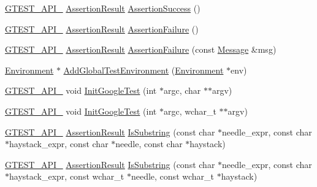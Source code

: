 \begin{DoxyCompactItemize}
\item 
\hyperlink{gtest-port_8h_aa73be6f0ba4a7456180a94904ce17790}{G\+T\+E\+S\+T\+\_\+\+A\+P\+I\+\_\+} \hyperlink{classtesting_1_1AssertionResult}{Assertion\+Result} \hyperlink{namespacetesting_ac1d0baedb17286c5c6c87bd1a45da8ac}{Assertion\+Success} ()
\item 
\hyperlink{gtest-port_8h_aa73be6f0ba4a7456180a94904ce17790}{G\+T\+E\+S\+T\+\_\+\+A\+P\+I\+\_\+} \hyperlink{classtesting_1_1AssertionResult}{Assertion\+Result} \hyperlink{namespacetesting_a75cb789614cb1c28c34627a4a3c053df}{Assertion\+Failure} ()
\item 
\hyperlink{gtest-port_8h_aa73be6f0ba4a7456180a94904ce17790}{G\+T\+E\+S\+T\+\_\+\+A\+P\+I\+\_\+} \hyperlink{classtesting_1_1AssertionResult}{Assertion\+Result} \hyperlink{namespacetesting_a6bdf82adf159dcda822d75746937ffa9}{Assertion\+Failure} (const \hyperlink{classtesting_1_1Message}{Message} \&msg)
\item 
\hyperlink{classtesting_1_1Environment}{Environment} $\ast$ \hyperlink{namespacetesting_a460d7b998622e332392c1e00be3a60d5}{Add\+Global\+Test\+Environment} (\hyperlink{classtesting_1_1Environment}{Environment} $\ast$env)
\item 
\hyperlink{gtest-port_8h_aa73be6f0ba4a7456180a94904ce17790}{G\+T\+E\+S\+T\+\_\+\+A\+P\+I\+\_\+} void \hyperlink{namespacetesting_afd726ae08c9bd16dc52f78c822d9946b}{Init\+Google\+Test} (int $\ast$argc, char $\ast$$\ast$argv)
\item 
\hyperlink{gtest-port_8h_aa73be6f0ba4a7456180a94904ce17790}{G\+T\+E\+S\+T\+\_\+\+A\+P\+I\+\_\+} void \hyperlink{namespacetesting_ae5a88709a4a7529e30c83242156556b3}{Init\+Google\+Test} (int $\ast$argc, wchar\+\_\+t $\ast$$\ast$argv)
\item 
\hyperlink{gtest-port_8h_aa73be6f0ba4a7456180a94904ce17790}{G\+T\+E\+S\+T\+\_\+\+A\+P\+I\+\_\+} \hyperlink{classtesting_1_1AssertionResult}{Assertion\+Result} \hyperlink{namespacetesting_a390c4f66fe7e9098117eb77e5fffa4ad}{Is\+Substring} (const char $\ast$needle\+\_\+expr, const char $\ast$haystack\+\_\+expr, const char $\ast$needle, const char $\ast$haystack)
\item 
\hyperlink{gtest-port_8h_aa73be6f0ba4a7456180a94904ce17790}{G\+T\+E\+S\+T\+\_\+\+A\+P\+I\+\_\+} \hyperlink{classtesting_1_1AssertionResult}{Assertion\+Result} \hyperlink{namespacetesting_aa1c82529c7591d2a9fd016de45dd9113}{Is\+Substring} (const char $\ast$needle\+\_\+expr, const char $\ast$haystack\+\_\+expr, const wchar\+\_\+t $\ast$needle, const wchar\+\_\+t $\ast$haystack)
\item 

\end{DoxyCompactItemize}
